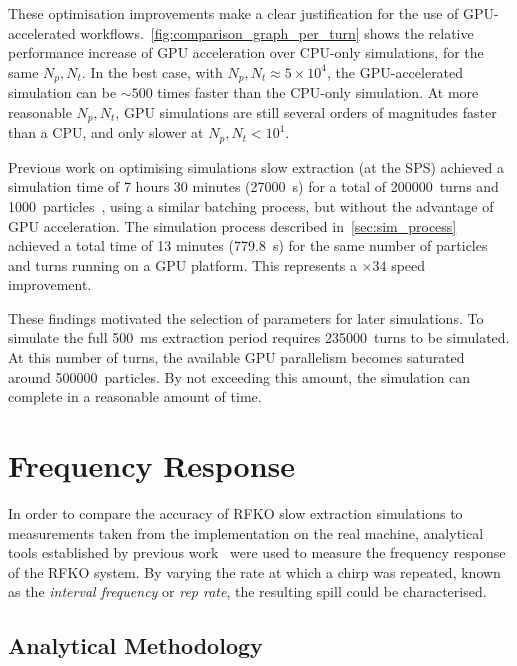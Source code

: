 \documentclass[11pt]{report}
\begin{document}
These optimisation improvements make a clear justification for the use of GPU-accelerated workflows.~\autoref{fig:comparison_graph_per_turn} shows the relative performance increase of GPU acceleration over CPU-only simulations, for the same $N_p, N_t$. In the best case, with $N_p, N_t \approx 5\times 10^4$, the GPU-accelerated simulation can be $\sim 500$ times faster than the CPU-only simulation. At more reasonable $N_p, N_t$, GPU simulations are still several orders of magnitudes faster than a CPU, and only slower at $N_p, N_t < 10^1$.

Previous work on optimising simulations slow extraction (at the SPS) achieved a simulation time of 7 hours 30 minutes (\qty{27000}{\second}) for a total of \qty{200000}{turns} and \qty{1000}{particles}~\cite[Figure 3]{Schicho:2039579}, using a similar batching process, but without the advantage of GPU acceleration. The simulation process described in~\autoref{sec:sim_process} achieved a total time of 13 minutes (\qty{779.8}{\second}) for the same number of particles and turns running on a GPU platform. This represents a $\times 34$ speed improvement.

These findings motivated the selection of parameters for later simulations. To simulate the full \qty{500}{\milli\second} extraction period requires \qty{235000}{turns} to be simulated. At this number of turns, the available GPU parallelism becomes saturated around \qty{500000}{particles}. By not exceeding this amount, the simulation can complete in a reasonable amount of time.

\clearpage
\section{Frequency Response}\label{results:freq_response}

In order to compare the accuracy of RFKO slow extraction simulations to measurements taken from the implementation on the real machine, analytical tools established by previous work~\cite{Pari:2780495} were used to measure the frequency response of the RFKO system. By varying the rate at which a chirp was repeated, known as the \textit{interval frequency} or \textit{rep rate}, the resulting spill could be characterised. 

\subsection{Analytical Methodology}\label{sec:machine_freq_anal_method}
\end{document}
